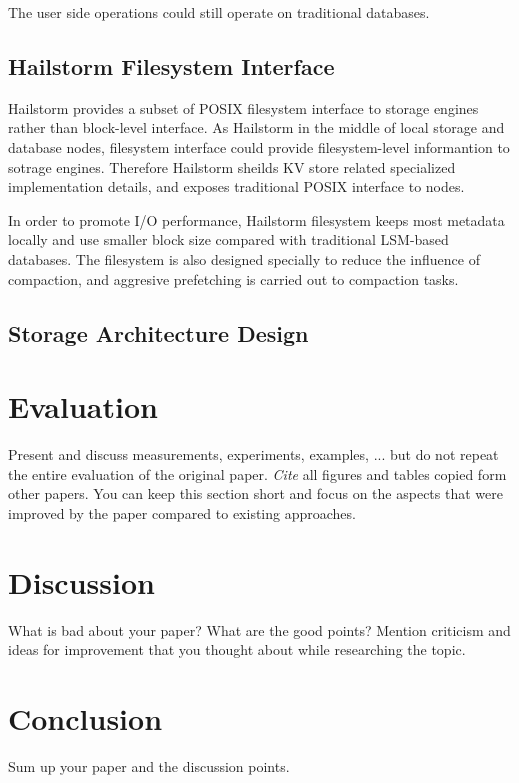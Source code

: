 \documentclass[a4paper,10pt,twoside]{article}
\begin{document}
The user side operations could still operate on traditional databases. 

\subsection{Hailstorm Filesystem Interface}
Hailstorm provides a subset of POSIX filesystem interface to storage engines rather than block-level interface.
As Hailstorm in the middle of local storage and database nodes, filesystem interface could provide filesystem-level informantion to sotrage engines.
Therefore Hailstorm sheilds KV store related specialized implementation details, and exposes traditional POSIX interface to nodes.
\par
In order to promote I/O performance, Hailstorm filesystem keeps most metadata locally and use smaller block size compared with traditional LSM-based databases.
The filesystem is also designed specially to reduce the influence of compaction, and aggresive prefetching is carried out to compaction tasks.

\subsection{Storage Architecture Design}




\section{Evaluation}

Present and discuss measurements, experiments, examples, ... but do not repeat the entire evaluation of the original paper.
\emph{Cite} all figures and tables copied form other papers.
You can keep this section short and focus on the aspects that were improved by the paper compared to existing approaches.

\section{Discussion}

What is bad about your paper? 
What are the good points? 
Mention criticism and ideas for improvement that you thought about while researching the topic.

\section{Conclusion}

Sum up your paper and the discussion points.


 
\end{document}
